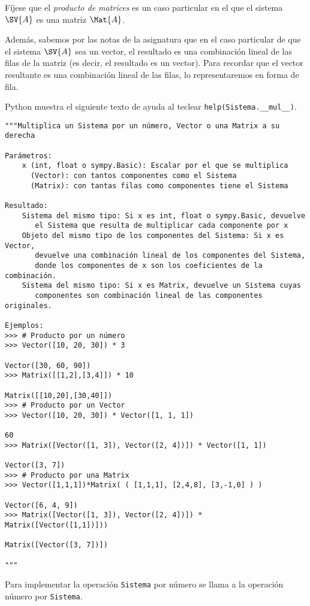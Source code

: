 \documentclass[11pt]{report}
\begin{document}
Fíjese que el \emph{producto de matrices} es un caso particular en el que
el sistema \(\SV{A}\) es una matriz \(\Mat{A}\).

Además, sabemos por las notas de la asignatura que en el caso
particular de que el sistema \(\SV{A}\) sea un vector, el resultado es
una combinación lineal de las filas de la matriz  (es decir, el
resultado es un vector). Para recordar que el vector resultante es una
combinación lineal de las filas, lo representaremos en forma de fila.

Python muestra el siguiente texto de ayuda al teclear
\texttt{help(Sistema.\_\_mul\_\_)}.
\begin{verbatim}
"""Multiplica un Sistema por un número, Vector o una Matrix a su derecha

Parámetros:
    x (int, float o sympy.Basic): Escalar por el que se multiplica
      (Vector): con tantos componentes como el Sistema
      (Matrix): con tantas filas como componentes tiene el Sistema

Resultado:
    Sistema del mismo tipo: Si x es int, float o sympy.Basic, devuelve 
       el Sistema que resulta de multiplicar cada componente por x
    Objeto del mismo tipo de los componentes del Sistema: Si x es Vector,
       devuelve una combinación lineal de los componentes del Sistema, 
       donde los componentes de x son los coeficientes de la combinación.
    Sistema del mismo tipo: Si x es Matrix, devuelve un Sistema cuyas 
       componentes son combinación lineal de las componentes originales.
       
Ejemplos:
>>> # Producto por un número
>>> Vector([10, 20, 30]) * 3

Vector([30, 60, 90])
>>> Matrix([[1,2],[3,4]]) * 10

Matrix([[10,20],[30,40]])
>>> # Producto por un Vector
>>> Vector([10, 20, 30]) * Vector([1, 1, 1])

60
>>> Matrix([Vector([1, 3]), Vector([2, 4])]) * Vector([1, 1])

Vector([3, 7])
>>> # Producto por una Matrix
>>> Vector([1,1,1])*Matrix( ( [1,1,1], [2,4,8], [3,-1,0] ) )

Vector([6, 4, 9])
>>> Matrix([Vector([1, 3]), Vector([2, 4])]) * Matrix([Vector([1,1])]))

Matrix([Vector([3, 7])])

"""
\end{verbatim}

Para implementar la operación \texttt{Sistema} por número se llama a la
operación número por \texttt{Sistema}.
\end{document}
